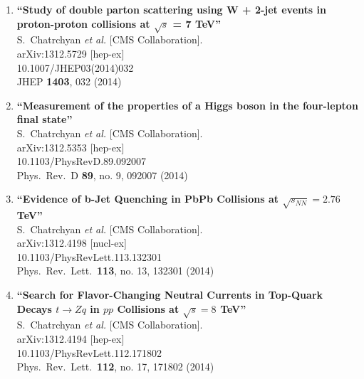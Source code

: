\documentclass{article}
\begin{document}
\begin{enumerate}
\item%
{\bf ``Study of double parton scattering using W + 2-jet events in proton-proton collisions at $\sqrt{s}$ = 7 TeV''}
  \\{}S.~Chatrchyan {\it et al.}  [CMS Collaboration].
  \\{}arXiv:1312.5729 [hep-ex]
    \\{}10.1007/JHEP03(2014)032
\\{}JHEP {\bf 1403}, 032 (2014) %


\item%
{\bf ``Measurement of the properties of a Higgs boson in the four-lepton final state''}
  \\{}S.~Chatrchyan {\it et al.}  [CMS Collaboration].
  \\{}arXiv:1312.5353 [hep-ex]
    \\{}10.1103/PhysRevD.89.092007
\\{}Phys.\ Rev.\ D {\bf 89}, no. 9, 092007 (2014) %


\item%
{\bf ``Evidence of b-Jet Quenching in PbPb Collisions at $\sqrt{s_{NN}}=2.76$  TeV''}
  \\{}S.~Chatrchyan {\it et al.}  [CMS Collaboration].
  \\{}arXiv:1312.4198 [nucl-ex]
    \\{}10.1103/PhysRevLett.113.132301
\\{}Phys.\ Rev.\ Lett.\  {\bf 113}, no. 13, 132301 (2014) %


\item%
{\bf ``Search for Flavor-Changing Neutral Currents in Top-Quark Decays $t \to Zq$ in $pp$ Collisions at $\sqrt{s}=8$  TeV''}
  \\{}S.~Chatrchyan {\it et al.}  [CMS Collaboration].
  \\{}arXiv:1312.4194 [hep-ex]
    \\{}10.1103/PhysRevLett.112.171802
\\{}Phys.\ Rev.\ Lett.\  {\bf 112}, no. 17, 171802 (2014) %



\end{enumerate}
\end{document}
